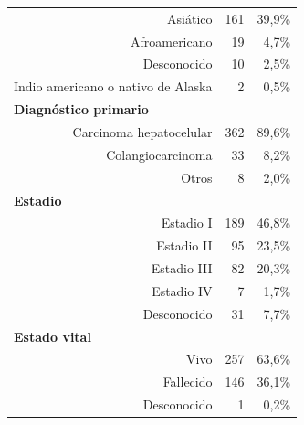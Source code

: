 \begin{table}[H]
\begin{tabular}{rrr}
		Asiático                                          & 161                      & 39,9\%                    \\
		Afroamericano                             & 19                       & 4,7\%                     \\
		Desconocido                                       & 10                       & 2,5\%                     \\
		Indio americano o nativo de Alaska                & 2                        & 0,5\%                     \\ \hline
		\multicolumn{1}{l}{\textbf{Diagnóstico primario}} &                          &                           \\
		Carcinoma hepatocelular                           & 362                      & 89,6\%                    \\
		Colangiocarcinoma                                 & 33                       & 8,2\%                     \\
		Otros                                             & 8                        & 2,0\%                       \\ \hline
		\multicolumn{1}{l}{\textbf{Estadio}}              &                          &                           \\
		Estadio I                                         & 189                      & 46,8\%                    \\
		Estadio II                                        & 95                       & 23,5\%                    \\
		Estadio III                                       & 82                       & 20,3\%                    \\
		Estadio IV                                        & 7                        & 1,7\%                     \\
		Desconocido                                       & 31                       & 7,7\%                     \\ \hline
		\multicolumn{1}{l}{\textbf{Estado vital}}         &                          &                           \\
		Vivo                                              & 257                      & 63,6\%                    \\
		Fallecido                                         & 146                      & 36,1\%                    \\
		Desconocido                                       & 1                        & 0,2\%                     \\ \hline
	\end{tabular}
\end{table}

